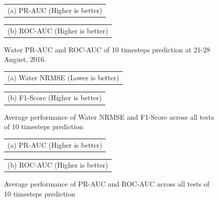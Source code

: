 \begin{figure}
    \begin{center}
        \begin{tabular}[b]{c}
             \\
            \small (a) PR-AUC (Higher is better)
        \end{tabular} 
        \begin{tabular}[b]{c}
             \\
            \small (b) ROC-AUC (Higher is better)
        \end{tabular}
    \end{center}
    \caption{Water PR-AUC and ROC-AUC of 10 timesteps prediction at 21-28 August, 2016.}
    \label{fig:chap4-test-30-3}
\end{figure}


\begin{figure}
    \begin{center}
        \begin{tabular}[b]{c}
             \\
            \small (a) Water NRMSE (Lower is better)
        \end{tabular} 
        \begin{tabular}[b]{c}
             \\
            \small (b) F1-Score (Higher is better)
        \end{tabular}
    \end{center}
    \caption{Average performance of Water NRMSE and F1-Score across all tests of 10 timesteps prediction}
    \label{fig:chap4-performance-all-tests-1}
\end{figure}

\begin{figure}
    \begin{center}
        \begin{tabular}[b]{c}
             \\
            \small (a) PR-AUC (Higher is better)
        \end{tabular} 
        \begin{tabular}[b]{c}
             \\
            \small (b) ROC-AUC (Higher is better)
        \end{tabular}
    \end{center}
    \caption{Average performance of PR-AUC and ROC-AUC across all tests of 10 timesteps prediction}
    \label{fig:chap4-performance-all-tests-2}
\end{figure}

